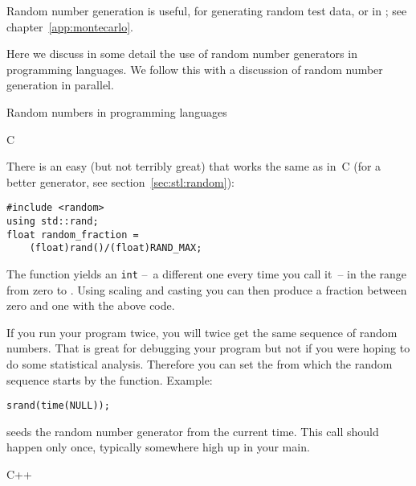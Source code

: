 
Random number generation is useful,
for generating random test data,
or in ;
see chapter~\ref{app:montecarlo}.

Here we discuss in some detail the use of random number generators
in programming languages.
We follow this with a discussion of random number generation in parallel.

 {Random numbers in programming languages}

 {C}
\lstset{language=C}

There is an easy (but not terribly great)
that works the same as in~C (for a better
generator, see section~\ref{sec:stl:random}):
%
\begin{lstlisting}
#include <random>
using std::rand;
float random_fraction =
    (float)rand()/(float)RAND_MAX;
\end{lstlisting}
%
The function  yields an \lstinline{int}
--~a different one every time you call it~--
in the range from zero to .
Using scaling and casting you can then produce a fraction between zero
and one with the above code.

If you run your program twice, you will twice get the same sequence of
random numbers. That is great for debugging your program but not if
you were hoping to do some statistical analysis. Therefore you can set
the  from which the random sequence
starts by the  function. Example:
\begin{lstlisting}
srand(time(NULL));
\end{lstlisting}
seeds the random number generator from the current time.
This call should happen only once, typically somewhere high up in your main.


 {C++}
\lstset{language=C++}

